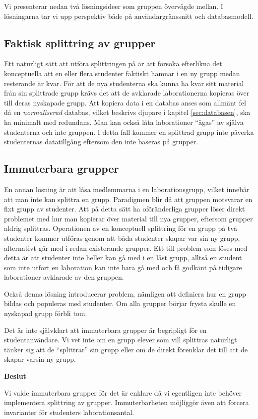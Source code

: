 Vi presenterar nedan två lösningsideer som gruppen övervägde mellan. I lösningarna tar vi upp perspektiv både på användargränssnitt och databasmodell.

\subsection{Faktisk splittring av grupper}
Ett naturligt sätt att utföra splittringen på är att försöka efterlikna det konceptuella att en eller flera studenter faktiskt hamnar i en ny grupp medan resterande är kvar. För att de nya studenterna ska kunna ha kvar sitt material från sin splittrade grupp krävs det att de avklarade laborationerna kopieras över till deras nyskapade grupp. Att kopiera data i en databas anses som allmänt fel då en \emph{normaliserad} databas, vilket beskrivs djupare i kapitel \ref{sec:databasen}, ska ha minimalt med redundans. Man kan också låta laborationer “ägas” av själva studenterna och inte gruppen. I detta fall kommer en splittrad grupp inte påverka studenternas datatillgång eftersom den inte baseras på grupper.

\subsection{Immuterbara grupper}
En annan lösning är att låsa medlemmarna i en laborationsgrupp, vilket innebär att man inte kan splittra en grupp. Paradigmen blir då att gruppen motsvarar en fixt grupp av studenter. Att på detta sätt ha oföränderliga grupper löser direkt problemet med hur man kopierar över material till nya grupper, eftersom grupper aldrig splittras. Operationen av en konceptuell splittring för en grupp på två studenter kommer utföras genom att båda studenter skapar var sin ny grupp, alternativt går med i redan existerande grupper. Ett till problem som löses med detta är att studenter inte heller kan gå med i en låst grupp, alltså en student som inte utfört en laboration kan inte bara gå med och få godkänt på tidigare laborationer avklarade av den gruppen.

Också denna lösning introducerar problem, nämligen att definiera hur en grupp bildas och populeras med studenter. Om alla grupper börjar frysta skulle en nyskapad grupp förbli tom.

Det är inte självklart att immuterbara grupper är begripligt för en studentanvändare.  Vi vet inte om en grupp elever som vill splittras naturligt tänker sig att de “splittrar” sin grupp eller om de direkt förenklar det till att de skapar varsin ny grupp.

\begin{flushright}

  \textbf{Beslut}

  Vi valde immuterbara grupper för det är enklare då vi egentligen inte behöver implementera splittring av grupper. Immuterbarheten möjliggör även att forcera invarianter för studenters laborationsantal.
\end{flushright}
